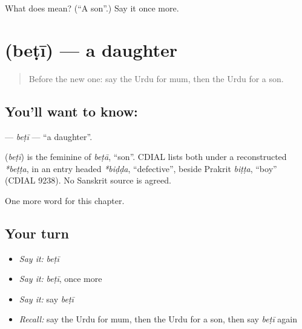 \begin{tcolorbox}[breakable,colback=teal!4,colframe=teal!35!black,title={Before you move on}]
What does  mean? (\textquotedblleft{}A son\textquotedblright{}.) Say it once more.
\end{tcolorbox}
\section[\texorpdfstring{\ur{بیٹی} (beṭī)}{بیٹی (beṭī)}]{ (beṭī) — a daughter}

\label{lesson:UR-C43-beti}



\begin{quote}
Before the new one: say the Urdu for mum, then the Urdu for a son.
\end{quote}

\subsection*{You'll want to know: }
\textbf{} — \emph{beṭī} — \textquotedblleft{}a daughter\textquotedblright{}.

\begin{cousinweb}
\textbf{} (\emph{beṭī}) is the feminine of \emph{beṭā}, \textquotedblleft{}son\textquotedblright{}. CDIAL lists both under a reconstructed \emph{*beṭṭa}, in an entry headed \emph{*biḍḍa}, \textquotedblleft{}defective\textquotedblright{}, beside Prakrit \emph{biṭṭa}, \textquotedblleft{}boy\textquotedblright{} (CDIAL 9238). No Sanskrit source is agreed.
\end{cousinweb}

\begin{grammarlens}[title={What you've built}]
One more word for this chapter.
\end{grammarlens}

\subsection*{Your turn}
\begin{itemize}
\raggedright
  \item \emph{Say it:} \emph{beṭī}
  \item \emph{Say it:} \emph{beṭī}, once more
  \item \emph{Say it:} say \emph{beṭī}
  \item \emph{Recall:} say the Urdu for mum, then the Urdu for a son, then say \emph{beṭī} again
\end{itemize}

